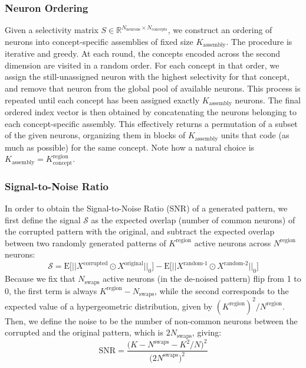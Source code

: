 \documentclass{article}
\begin{document}
\subsubsection*{Neuron Ordering}
Given a selectivity matrix $S \in \mathbb{R}^{N_\textrm{neurons} \times N_\textrm{concepts}}$, we construct an ordering of neurons into concept-specific assemblies of fixed size $K_\textrm{assembly}$. The procedure is iterative and greedy. At each round, the concepts encoded across the second dimension are visited in a random order. For each concept in that order, we assign the still-unassigned neuron with the highest selectivity for that concept, and remove that neuron from the global pool of available neurons. This process is repeated until each concept has been assigned exactly $K_\textrm{assembly}$ neurons. The final ordered index vector is then obtained by concatenating the neurons belonging to each concept-specific assembly. This effectively returns a permutation of a subset of the given neurons, organizing them in blocks of $K_\textrm{assembly}$ units that code (as much as possible) for the same concept. Note how a natural choice is $K_\textrm{assembly} = K^\textrm{region}_\textrm{concept}$.
\subsubsection*{Signal-to-Noise Ratio}
In order to obtain the Signal-to-Noise Ratio (SNR) of a generated pattern, we first define the signal  $\mathcal{S}$  as the expected overlap (number of common neurons) of the corrupted pattern with the original, and subtract the expected overlap between two randomly generated patterns of $K^\textrm{region}$ active neurons across $N^\textrm{region}$ neurons:
\begin{equation}
\mathcal{S}  =  \textrm{E}\Big[|| X^\textrm{corrupted} \odot X^\textrm{original}||_0\Big] - \textrm{E}\Big[|| X^\textrm{random-1} \odot X^\textrm{random-2}||_0\Big]
\end{equation}
Because we fix that $N_\textrm{swaps}$ active neurons (in the de-noised pattern) flip from 1 to 0, the first term is always $K^\textrm{region} - N_\textrm{swaps}$, while the second corresponds to the expected value of a hypergeometric distribution, given by $(K^\textrm{region})^2/N^\textrm{region}$. Then, we define the noise to be the number of non-common neurons between the corrupted and the original pattern, which is $2N_\textrm{swaps}$, giving:
\begin{equation}
    \mathrm{SNR} = \frac{\Big(K - N^\textrm{swaps}- K^2/N\Big)^2}{\Big(2N^\textrm{swaps}\Big)^2}
    \label{eq:snr}
\end{equation}
\end{document}
